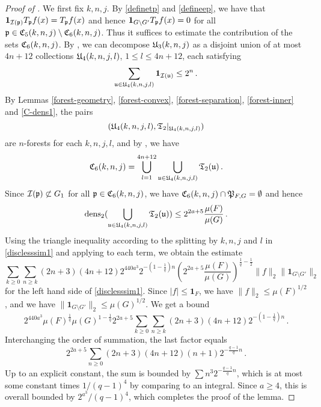 \begin{proof}[Proof of ]
    \leanok

    We first fix $k,n, j$.
    By \eqref{definetp} and \eqref{defineep}, we have that
    $\mathbf{1}_{{\mathcal{I}}({\mathfrak p})} T_{{\mathfrak p}}f(x) = T_{{\mathfrak p}}f(x)$ and hence $\mathbf{1}_{G \setminus G'} T_{{\mathfrak p}}f(x)= 0$ for all ${\mathfrak p} \in {\mathfrak C}_5(k,n,j) \setminus {\mathfrak C}_6(k,n,j)$.
    Thus it suffices to estimate the contribution of the sets ${\mathfrak C}_6(k,n,j)$. By , we can decompose ${\mathfrak U}_3(k,n,j)$ as a disjoint union of at most $4n + 12$ collections ${\mathfrak U}_4(k,n,j,l)$, $1 \le l \le 4n+12$, each satisfying
    $$
        \sum_{{\mathfrak u} \in {\mathfrak U}_4(k,n,j,l)} \mathbf{1}_{{\mathcal{I}}({\mathfrak u})} \le 2^n\,.
    $$
    By Lemmas \ref{forest-geometry}, \ref{forest-convex}, \ref{forest-separation}, \ref{forest-inner} and \ref{C-dens1}, the pairs
    $$
        ({\mathfrak U}_4(k,n,j,l), \mathfrak{T}_2|_{{\mathfrak U}_4(k,n,j,l)})
    $$
    are $n$-forests for each $k,n,j,l$, and by , we have
    $$
        {\mathfrak C}_6(k,n,j) = \bigcup_{l = 1}^{4n + 12} \bigcup_{{\mathfrak u} \in {\mathfrak U}_4(k,n,j,l)} \mathfrak{T}_2({\mathfrak u})\,.
    $$
    Since ${\mathcal{I}}({\mathfrak p}) \not\subset G_1$ for all ${\mathfrak p} \in {\mathfrak C}_6(k,n,j)$, we have ${\mathfrak C}_6(k,n,j) \cap {\mathfrak P}_{F,G} = \emptyset$ and hence
    $$
        \operatorname{\operatorname{dens}}_2(\bigcup_{{\mathfrak u} \in {\mathfrak U}_4(k,n,j,l)} \mathfrak{T}_2({\mathfrak u})) \le 2^{2a + 5} \frac{\mu(F)}{\mu(G)}\,.
    $$
    Using the triangle inequality according to the splitting by $k,n,j$ and $l$ in \eqref{disclesssim1} and applying  to each term, we obtain the estimate
    $$
        \sum_{k \ge 0}\sum_{n \ge k} (2n+3)(4n+12) 2^{440a^3}2^{-(1-\frac{1}{q})n}(2^{2a+5} \frac{\mu(F)}{\mu(G)})^{\frac{1}{q} - \frac{1}{2}} \|f\|_2 \|\mathbf{1}_{G\setminus G'}\|_2
    $$
    for the left hand side of \eqref{disclesssim1}. Since $|f| \le \mathbf{1}_F$, we have $\|f\|_2 \le \mu(F)^{1/2}$, and we have $\|\mathbf{1}_{G\setminus G'}\|_2 \le \mu(G)^{1/2}$.
    We get a bound
    $$
        2^{440a^3} \mu(F)^{\frac{1}{q}} \mu(G)^{1
        -\frac{1}{q}} 2^{2a+5}\sum_{k \ge 0}\sum_{n \ge k}(2n+3)(4n+12) 2^{-(1-\frac{1}{q})n}\,.
    $$ %
    Interchanging the order of summation, the last factor equals
    $$
        2^{2a+5} \sum_{n \ge 0} (2n+3)(4n+12) (n+1) 2^{-\frac{q-1}{q}n}\,.
    $$
    Up to an explicit constant, the sum is bounded by $\sum n^3 2^{-\frac{q-1}{q}n}$, which is at most
    some constant times $1/(q-1)^4$ by comparing to an integral. Since $a \ge 4$, this is overall bounded by $2^{a^3}/(q-1)^4$,
    which completes the proof of the lemma.
\end{proof}

